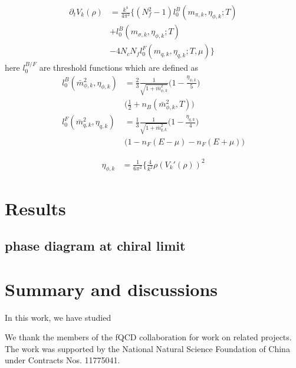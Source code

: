\documentclass[%
reprint,
superscriptaddress,
showpacs,preprintnumbers,
 amsmath,amssymb,
 aps,
prd,
]{revtex4-1}
\begin{document}
\begin{align}
	\partial_t V_k(\rho) &=\frac{k^4}{4 \pi^2} \{ ( N_f^2-1)l_0^B(m_{\pi,k},\eta_{\phi,k} ; T)\nonumber\\[2ex]
	&+l_0^B(m_{\sigma,k},\eta_{\phi,k}; T) \nonumber\\[2ex]
	&-4N_c N_f l_0^F(m_{q,k},\eta_{q,k};T,\mu)\}
\end{align}
here $l_0^{B/F}$ are threshold functions which are defined as
\begin{align}
	l_0^B(\bar m_{\phi,k}^2,\eta_{\phi,k}) &=\frac{2}{3}\frac{1}{\sqrt{1+\bar m_{\phi,k}^2}} \Big ( 1-\frac{\eta_{\phi,k}}{5}\Big) \nonumber\\[2ex] 
	&\Big( \frac{1}{2}+n_B(\bar m_{\phi,k}^2,T) \Big)  \\[2ex]
	l_0^F(\bar m_{q,k}^2,\eta_{q,k})&=\frac{1}{3} \frac{1}{\sqrt{1+\bar m_{q,k}^2}} \Big(1-\frac{\eta_{q,k}}{4}\Big) \nonumber\\[2ex]
	&\Big(1-n_F(E-\mu)-n_F(E+\mu))
\end{align}

\begin{align}
	\eta_{\phi,k}&=\frac{1}{6\pi^2} \Big\{ \frac{4}{k^2} \rho (V_k'(\rho))^2
\end{align}
\section{Results}
\label{sec:Results}

\subsection{phase diagram at chiral limit}


\section{Summary and discussions}
\label{sec:sum}

In this work, we have studied


\begin{acknowledgments}

We thank the members of the fQCD collaboration \cite{fQCD} for work on related projects. The work was supported by the National Natural Science Foundation of China under Contracts Nos. 11775041.

\end{acknowledgments}




\end{document}
